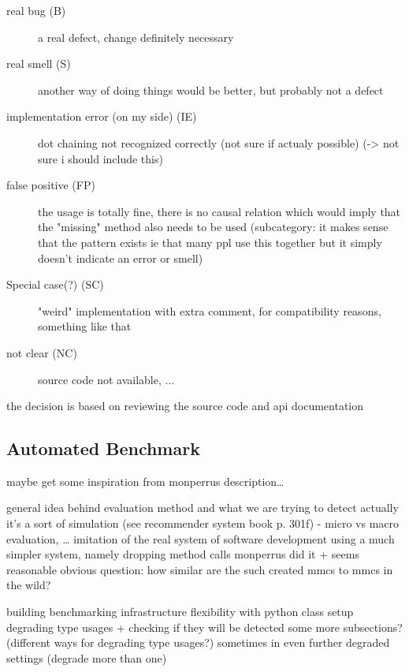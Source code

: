 \begin{description}
    \item [real bug (B)] a real defect, change definitely necessary
    \item [real smell (S)] another way of doing things would be better, but probably not a defect
    \item [implementation error (on my side) (IE)] dot chaining not recognized correctly (not sure if actualy possible) (-> not sure i should include this)
    \item [false positive (FP)] the usage is totally fine, there is no causal relation which would imply that the "missing" method also needs to be used
	(subcategory: it makes sense that the pattern exists ie that many ppl use this together but it simply doesn't indicate an error or smell)
    \item [Special case(?) (SC)] "weird" implementation with extra comment, for compatibility reasons, something like that
    \item [not clear (NC)] source code not available, ...
\end{description}

the decision is based on reviewing the source code and api documentation


\subsection{Automated Benchmark}

maybe get some inspiration from monperrus description\ldots

general idea behind evaluation method and what we are trying to detect
actually it's a sort of simulation (see recommender system book p. 301f) - micro vs macro evaluation, \ldots
    imitation of the real system of software development
    using a much simpler system, namely dropping method calls
monperrus did it + seems reasonable
    obvious question: how similar are the such created mmcs to mmcs in the wild?

building benchmarking infrastructure
flexibility with python class setup
degrading type usages + checking if they will be detected
    some more subsections? (different ways for degrading type usages?)
    sometimes in even further degraded settings (degrade more than one)

